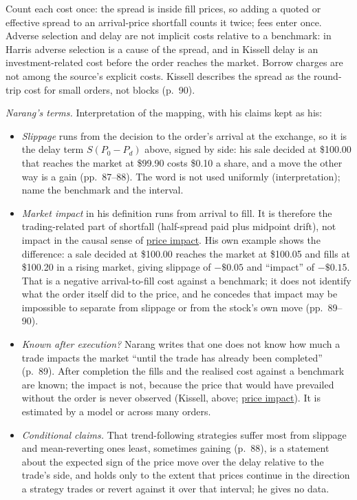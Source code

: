 \begin{qfdefinition}
 Count each cost once: the spread is inside fill prices, so adding a quoted or effective spread to an arrival-price shortfall counts it twice; fees enter once. Adverse selection and delay are not implicit costs relative to a benchmark: in Harris adverse selection is a cause of the spread, and in Kissell delay is an investment-related cost before the order reaches the market. Borrow charges are not among the source's explicit costs. Kissell describes the spread as the round-trip cost for small orders, not blocks (p.~90).

\emph{Narang's terms.} Interpretation of the mapping, with his claims kept as his:
\begin{itemize}
\item \emph{Slippage} runs from the decision to the order's arrival at the exchange, so it is the delay term $S(P_0-P_d)$ above, signed by side: his sale decided at \$100.00 that reaches the market at \$99.90 costs \$0.10 a share, and a move the other way is a gain (pp.~87--88). The word is not used uniformly (interpretation); name the benchmark and the interval.
\item \emph{Market impact} in his definition runs from arrival to fill. It is therefore the trading-related part of shortfall (half-spread paid plus midpoint drift), not impact in the causal sense of \hyperref[def:price-impact]{price impact}. His own example shows the difference: a sale decided at \$100.00 reaches the market at \$100.05 and fills at \$100.20 in a rising market, giving slippage of $-\$0.05$ and ``impact'' of $-\$0.15$. That is a negative arrival-to-fill cost against a benchmark; it does not identify what the order itself did to the price, and he concedes that impact may be impossible to separate from slippage or from the stock's own move (pp.~89--90).
\item \emph{Known after execution?} Narang writes that one does not know how much a trade impacts the market ``until the trade has already been completed'' (p.~89). After completion the fills and the realised cost against a benchmark are known; the impact is not, because the price that would have prevailed without the order is never observed (Kissell, above; \hyperref[def:price-impact]{price impact}). It is estimated by a model or across many orders.
\item \emph{Conditional claims.} That trend-following strategies suffer most from slippage and mean-reverting ones least, sometimes gaining (p.~88), is a statement about the expected sign of the price move over the delay relative to the trade's side, and holds only to the extent that prices continue in the direction a strategy trades or revert against it over that interval; he gives no data.


\end{itemize}
\end{qfdefinition}
